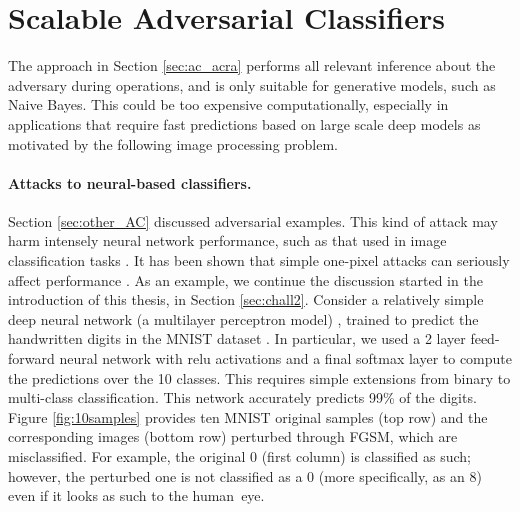 \section{Scalable Adversarial Classifiers}\label{sec:scalable}
%
The approach in Section \ref{sec:ac_acra} performs all relevant inference about the adversary during operations, and is only suitable for generative models, such as Naive Bayes. This could be too expensive computationally, especially in applications that require fast predictions
based on large scale deep models as motivated by the following image
processing problem.


\paragraph{Attacks to neural-based classifiers.}
Section \ref{sec:other_AC} discussed adversarial examples.  This kind of attack may harm intensely neural
network performance, such as that used in image classification tasks \parencite{szegedy2013intriguin}. It has been shown that simple one-pixel attacks can seriously affect performance \parencite{su2019one}.
As an example, we continue the discussion started in the introduction of this thesis, in Section \ref{sec:chall2}. Consider 
a relatively simple deep neural network (a multilayer perceptron model) \parencite{10.5555/3086952}, trained to predict the handwritten digits in the MNIST dataset \parencite{MNIST}. In particular, we used a 2 layer feed-forward neural network with relu activations and a final softmax layer to compute the predictions over the 10 classes. This requires simple extensions from binary to multi-class classification. This network accurately predicts 99\% of the digits. Figure \ref{fig:10samples} provides ten MNIST original 
samples (top row) and the corresponding images (bottom row) perturbed through FGSM,
which are misclassified. For example, the original 0 
(first column) is classified
as such; however, the perturbed one
is not classified as a 0 (more specifically, as an 8) even if it looks as such to the human~eye.%


